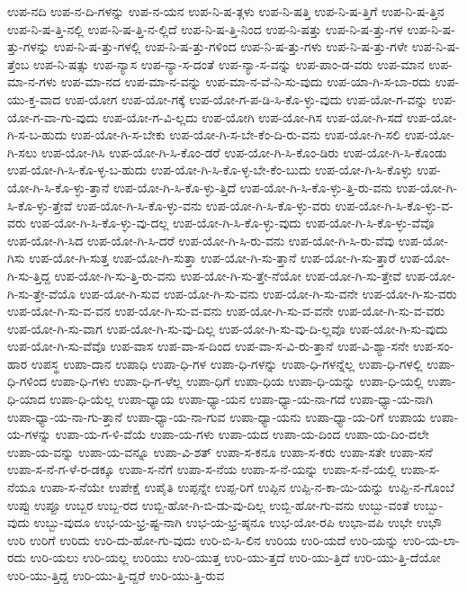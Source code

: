 {ಉಪ-ನದಿ
ಉಪ-ನ-ದಿ-ಗಳನ್ನು
ಉಪ-ನ-ಯನ
ಉಪ-ನಿ-ಷ-ತ್ಗಳು
ಉಪ-ನಿ-ಷತ್ತಿ
ಉಪ-ನಿ-ಷ-ತ್ತಿಗೆ
ಉಪ-ನಿ-ಷ-ತ್ತಿನ
ಉಪ-ನಿ-ಷ-ತ್ತಿ-ನಲ್ಲಿ
ಉಪ-ನಿ-ಷ-ತ್ತಿ-ನ-ಲ್ಲಿದೆ
ಉಪ-ನಿ-ಷ-ತ್ತಿ-ನಿಂದ
ಉಪ-ನಿ-ಷತ್ತು
ಉಪ-ನಿ-ಷ-ತ್ತು-ಗಳ
ಉಪ-ನಿ-ಷ-ತ್ತು-ಗಳನ್ನು
ಉಪ-ನಿ-ಷ-ತ್ತು-ಗಳಲ್ಲಿ
ಉಪ-ನಿ-ಷ-ತ್ತು-ಗಳಿಂದ
ಉಪ-ನಿ-ಷ-ತ್ತು-ಗಳು
ಉಪ-ನಿ-ಷ-ತ್ತು-ಗಳೇ
ಉಪ-ನಿ-ಷ-ತ್ತೆಂಬ
ಉಪ-ನಿ-ಷತ್ಸು
ಉಪ-ನ್ಯಾಸ
ಉಪ-ನ್ಯಾ-ಸ-ದಂತೆ
ಉಪ-ನ್ಯಾ-ಸ-ವನ್ನು
ಉಪ-ಪಾಂ-ಡ-ವರು
ಉಪ-ಮಾನ
ಉಪ-ಮಾ-ನ-ಗಳು
ಉಪ-ಮಾ-ನದ
ಉಪ-ಮಾ-ನ-ವನ್ನು
ಉಪ-ಮಾ-ನ-ವೆ-ನಿ-ಸು-ವುದು
ಉಪ-ಯಾ-ಗಿ-ಸ-ಬಾ-ರದು
ಉಪ-ಯು-ಕ್ತ-ವಾದ
ಉಪ-ಯೋಗ
ಉಪ-ಯೋ-ಗಕ್ಕೆ
ಉಪ-ಯೋ-ಗ-ಪ-ಡಿ-ಸಿ-ಕೊ-ಳ್ಳು-ವುದು
ಉಪ-ಯೋ-ಗ-ವನ್ನು
ಉಪ-ಯೋ-ಗ-ವಾ-ಗು-ವುದು
ಉಪ-ಯೋ-ಗ-ವಿ-ಲ್ಲದು
ಉಪ-ಯೋಗಿ
ಉಪ-ಯೋ-ಗಿಸ
ಉಪ-ಯೋ-ಗಿ-ಸದೆ
ಉಪ-ಯೋ-ಗಿ-ಸ-ಬ-ಹುದು
ಉಪ-ಯೋ-ಗಿ-ಸ-ಬೇಕು
ಉಪ-ಯೋ-ಗಿ-ಸ-ಬೇ-ಕೆಂ-ದಿ-ರು-ವನು
ಉಪ-ಯೋ-ಗಿ-ಸಲಿ
ಉಪ-ಯೋ-ಗಿ-ಸಲು
ಉಪ-ಯೋ-ಗಿಸಿ
ಉಪ-ಯೋ-ಗಿ-ಸಿ-ಕೊಂ-ಡರೆ
ಉಪ-ಯೋ-ಗಿ-ಸಿ-ಕೊಂ-ಡಿರು
ಉಪ-ಯೋ-ಗಿ-ಸಿ-ಕೊಂಡು
ಉಪ-ಯೋ-ಗಿ-ಸಿ-ಕೊ-ಳ್ಳ-ಬ-ಹುದು
ಉಪ-ಯೋ-ಗಿ-ಸಿ-ಕೊ-ಳ್ಳ-ಬೇ-ಕೆಂ-ಬುದು
ಉಪ-ಯೋ-ಗಿ-ಸಿ-ಕೊಳ್ಳು
ಉಪ-ಯೋ-ಗಿ-ಸಿ-ಕೊ-ಳ್ಳು-ತ್ತಾನೆ
ಉಪ-ಯೋ-ಗಿ-ಸಿ-ಕೊ-ಳ್ಳು-ತ್ತಿದೆ
ಉಪ-ಯೋ-ಗಿ-ಸಿ-ಕೊ-ಳ್ಳು-ತ್ತಿ-ರು-ವನು
ಉಪ-ಯೋ-ಗಿ-ಸಿ-ಕೊ-ಳ್ಳು-ತ್ತೇವೆ
ಉಪ-ಯೋ-ಗಿ-ಸಿ-ಕೊ-ಳ್ಳು-ವನು
ಉಪ-ಯೋ-ಗಿ-ಸಿ-ಕೊ-ಳ್ಳು-ವರು
ಉಪ-ಯೋ-ಗಿ-ಸಿ-ಕೊ-ಳ್ಳು-ವ-ವರು
ಉಪ-ಯೋ-ಗಿ-ಸಿ-ಕೊ-ಳ್ಳು-ವು-ದಲ್ಲ
ಉಪ-ಯೋ-ಗಿ-ಸಿ-ಕೊ-ಳ್ಳು-ವುದು
ಉಪ-ಯೋ-ಗಿ-ಸಿ-ಕೊ-ಳ್ಳು-ವೆವೊ
ಉಪ-ಯೋ-ಗಿ-ಸಿದ
ಉಪ-ಯೋ-ಗಿ-ಸಿ-ದರೆ
ಉಪ-ಯೋ-ಗಿ-ಸಿ-ರು-ವನು
ಉಪ-ಯೋ-ಗಿ-ಸಿ-ರು-ವೆವು
ಉಪ-ಯೋ-ಗಿಸು
ಉಪ-ಯೋ-ಗಿ-ಸುತ್ತ
ಉಪ-ಯೋ-ಗಿ-ಸುತ್ತಾ
ಉಪ-ಯೋ-ಗಿ-ಸು-ತ್ತಾನೆ
ಉಪ-ಯೋ-ಗಿ-ಸು-ತ್ತಾರೆ
ಉಪ-ಯೋ-ಗಿ-ಸು-ತ್ತಿದ್ದ
ಉಪ-ಯೋ-ಗಿ-ಸು-ತ್ತಿ-ರು-ವನು
ಉಪ-ಯೋ-ಗಿ-ಸು-ತ್ತೇ-ನೆಯೋ
ಉಪ-ಯೋ-ಗಿ-ಸು-ತ್ತೇವೆ
ಉಪ-ಯೋ-ಗಿ-ಸು-ತ್ತೇ-ವೆಯೊ
ಉಪ-ಯೋ-ಗಿ-ಸುವ
ಉಪ-ಯೋ-ಗಿ-ಸು-ವನು
ಉಪ-ಯೋ-ಗಿ-ಸು-ವನೇ
ಉಪ-ಯೋ-ಗಿ-ಸು-ವರು
ಉಪ-ಯೋ-ಗಿ-ಸು-ವ-ವನ
ಉಪ-ಯೋ-ಗಿ-ಸು-ವ-ವನು
ಉಪ-ಯೋ-ಗಿ-ಸು-ವ-ವನೇ
ಉಪ-ಯೋ-ಗಿ-ಸು-ವ-ವರು
ಉಪ-ಯೋ-ಗಿ-ಸು-ವಾಗ
ಉಪ-ಯೋ-ಗಿ-ಸು-ವು-ದಿಲ್ಲ
ಉಪ-ಯೋ-ಗಿ-ಸು-ವು-ದಿ-ಲ್ಲವೊ
ಉಪ-ಯೋ-ಗಿ-ಸು-ವುದು
ಉಪ-ಯೋ-ಗಿ-ಸು-ವೆವೊ
ಉಪ-ವಾಸ
ಉಪ-ವಾ-ಸ-ದಿಂದ
ಉಪ-ವಾ-ಸ-ವಿ-ರು-ತ್ತಾನೆ
ಉಪ-ವಿ-ಶ್ಯಾ-ಸನೇ
ಉಪ-ಸಂ-ಹಾರ
ಉಪಸ್ಥ
ಉಪಾ-ದಾನ
ಉಪಾಧಿ
ಉಪಾ-ಧಿ-ಗಳ
ಉಪಾ-ಧಿ-ಗಳನ್ನು
ಉಪಾ-ಧಿ-ಗಳನ್ನೆಲ್ಲ
ಉಪಾ-ಧಿ-ಗಳಲ್ಲಿ
ಉಪಾ-ಧಿ-ಗಳಿಂದ
ಉಪಾ-ಧಿ-ಗಳು
ಉಪಾ-ಧಿ-ಗ-ಳೆಲ್ಲ
ಉಪಾ-ಧಿಗೆ
ಉಪಾ-ಧಿಯ
ಉಪಾ-ಧಿ-ಯನ್ನು
ಉಪಾ-ಧಿ-ಯಲ್ಲಿ
ಉಪಾ-ಧಿ-ಯಾದ
ಉಪಾ-ಧಿ-ಯೆಲ್ಲ
ಉಪಾ-ಧ್ಯಾಯ
ಉಪಾ-ಧ್ಯಾ-ಯನ
ಉಪಾ-ಧ್ಯಾ-ಯ-ನಾ-ಗದೆ
ಉಪಾ-ಧ್ಯಾ-ಯ-ನಾಗಿ
ಉಪಾ-ಧ್ಯಾ-ಯ-ನಾ-ಗು-ತ್ತಾನೆ
ಉಪಾ-ಧ್ಯಾ-ಯ-ನಾ-ಗುವ
ಉಪಾ-ಧ್ಯಾ-ಯನು
ಉಪಾ-ಧ್ಯಾ-ಯ-ರಿಗೆ
ಉಪಾಯ
ಉಪಾ-ಯ-ಗಳನ್ನು
ಉಪಾ-ಯ-ಗ-ಳಿ-ವೆಯೆ
ಉಪಾ-ಯ-ಗಳು
ಉಪಾ-ಯದ
ಉಪಾ-ಯ-ದಿಂದ
ಉಪಾ-ಯ-ದಿಂ-ದಲೇ
ಉಪಾ-ಯ-ವನ್ನು
ಉಪಾ-ಯ-ವನ್ನೂ
ಉಪಾ-ವಿ-ಶತ್
ಉಪಾ-ಸ-ಕನೂ
ಉಪಾ-ಸ-ಕರು
ಉಪಾ-ಸತೇ
ಉಪಾ-ಸನೆ
ಉಪಾ-ಸ-ನೆ-ಗ-ಳೆ-ರ-ಡಕ್ಕೂ
ಉಪಾ-ಸ-ನೆಗೆ
ಉಪಾ-ಸ-ನೆಯ
ಉಪಾ-ಸ-ನೆ-ಯನ್ನು
ಉಪಾ-ಸ-ನೆ-ಯಲ್ಲಿ
ಉಪಾ-ಸ-ನೆಯೂ
ಉಪಾ-ಸ-ನೆಯೇ
ಉಪೇಕ್ಷೆ
ಉಪೈತಿ
ಉಪ್ಪನ್ನೇ
ಉಪ್ಪ-ರಿಗೆ
ಉಪ್ಪಿನ
ಉಪ್ಪಿ-ನ-ಕಾ-ಯಿ-ಯನ್ನು
ಉಪ್ಪಿ-ನ-ಗೊಂಬೆ
ಉಪ್ಪು
ಉಪ್ಪೂ
ಉಬ್ಬರ
ಉಬ್ಬ-ರದ
ಉಬ್ಬಿ-ಹೋ-ಗಿ-ಬಿ-ಡು-ವು-ದಿಲ್ಲ
ಉಬ್ಬಿ-ಹೋ-ಗು-ವನು
ಉಬ್ಬು-ವಂತೆ
ಉಬ್ಬು-ವುದು
ಉಬ್ಬು-ವುದೂ
ಉಭ-ಯ-ಭ್ರ-ಷ್ಟ-ನಾಗಿ
ಉಭ-ಯ-ಭ್ರ-ಷ್ಠನೂ
ಉಭ-ಯೋ-ರಪಿ
ಉಭಾ-ವಪಿ
ಉಭೇ
ಉಭೌ
ಉರಿ
ಉರಿಗೆ
ಉರಿದು
ಉರಿ-ದು-ಹೋ-ಗು-ವುದು
ಉರಿ-ಬಿ-ಸಿ-ಲಿನ
ಉರಿಯ
ಉರಿ-ಯದೆ
ಉರಿ-ಯನ್ನು
ಉರಿ-ಯ-ಲಾ-ರದು
ಉರಿ-ಯಲು
ಉರಿ-ಯಲ್ಲ
ಉರಿಯು
ಉರಿ-ಯುತ್ತ
ಉರಿ-ಯು-ತ್ತದೆ
ಉರಿ-ಯು-ತ್ತಿದೆ
ಉರಿ-ಯು-ತ್ತಿ-ದೆಯೋ
ಉರಿ-ಯು-ತ್ತಿದ್ದ
ಉರಿ-ಯು-ತ್ತಿ-ದ್ದರೆ
ಉರಿ-ಯು-ತ್ತಿ-ರುವ
}
